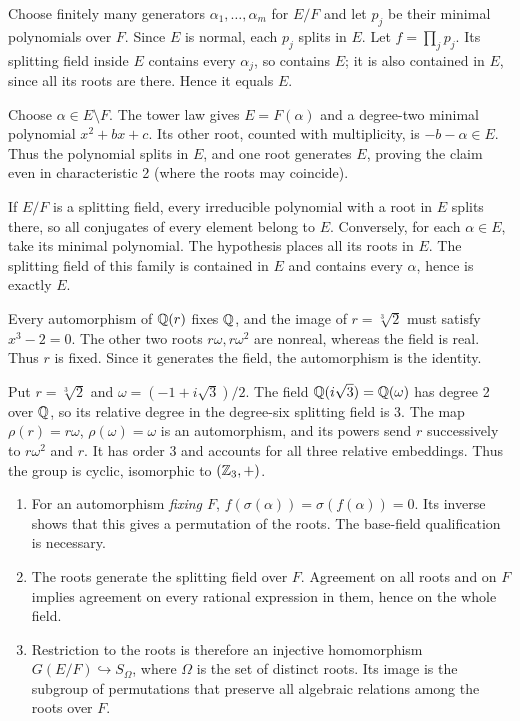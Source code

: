 Choose finitely many generators $\alpha_1,\ldots,\alpha_m$ for $E/F$ and let $p_j$ be their minimal polynomials over $F$. Since $E$ is normal, each $p_j$ splits in $E$. Let $f=\prod_jp_j$. Its splitting field inside $E$ contains every $\alpha_j$, so contains $E$; it is also contained in $E$, since all its roots are there. Hence it equals $E$.

Choose $\alpha\in E\setminus F$. The tower law gives $E=F(\alpha)$ and a degree-two minimal polynomial $x^2+bx+c$. Its other root, counted with multiplicity, is $-b-\alpha\in E$. Thus the polynomial splits in $E$, and one root generates $E$, proving the claim even in characteristic 2 (where the roots may coincide).

If $E/F$ is a splitting field, every irreducible polynomial with a root in $E$ splits there, so all conjugates of every element belong to $E$. Conversely, for each $\alpha\in E$, take its minimal polynomial. The hypothesis places all its roots in $E$. The splitting field of this family is contained in $E$ and contains every $\alpha$, hence is exactly $E$.

Every automorphism of $\mathbb{Q}(r)$ fixes $\mathbb{Q}$, and the image of $r=\sqrt[3]2$ must satisfy $x^3-2=0$. The other two roots $r\omega,r\omega^2$ are nonreal, whereas the field is real. Thus $r$ is fixed. Since it generates the field, the automorphism is the identity.

Put $r=\sqrt[3]2$ and $\omega=(-1+i\sqrt3)/2$. The field $\mathbb{Q}(i\sqrt3)=\mathbb{Q}(\omega)$ has degree 2 over $\mathbb{Q}$, so its relative degree in the degree-six splitting field is 3. The map $\rho(r)=r\omega$, $\rho(\omega)=\omega$ is an automorphism, and its powers send $r$ successively to $r\omega^2$ and $r$. It has order 3 and accounts for all three relative embeddings. Thus the group is cyclic, isomorphic to $(\mathbb{Z}_3,+)$.

\begin{enumerate}[label=(\alph*)]
\item For an automorphism \emph{fixing $F$}, $f(\sigma(\alpha))=\sigma(f(\alpha))=0$. Its inverse shows that this gives a permutation of the roots. The base-field qualification is necessary.
\item The roots generate the splitting field over $F$. Agreement on all roots and on $F$ implies agreement on every rational expression in them, hence on the whole field.
\item Restriction to the roots is therefore an injective homomorphism $G(E/F)\hookrightarrow S_\Omega$, where $\Omega$ is the set of distinct roots. Its image is the subgroup of permutations that preserve all algebraic relations among the roots over $F$.
\end{enumerate}

